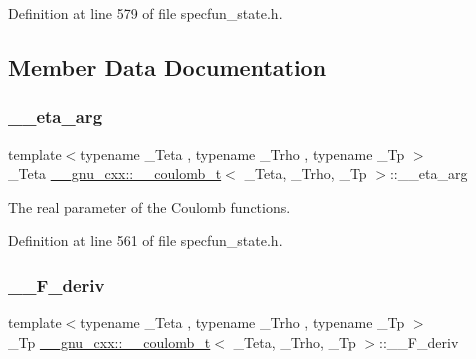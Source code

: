 Definition at line 579 of file specfun\+\_\+state.\+h.



\subsection{Member Data Documentation}
\mbox{\label{struct____gnu__cxx_1_1____coulomb__t_a174cc4a53442bfcd626bc07e1cba0162}} 
\subsubsection{\texorpdfstring{\+\_\+\+\_\+eta\+\_\+arg}{\_\_eta\_arg}}
{\footnotesize\ttfamily template$<$typename \+\_\+\+Teta , typename \+\_\+\+Trho , typename \+\_\+\+Tp $>$ \\
\+\_\+\+Teta \hyperlink{struct____gnu__cxx_1_1____coulomb__t}{\+\_\+\+\_\+gnu\+\_\+cxx\+::\+\_\+\+\_\+coulomb\+\_\+t}$<$ \+\_\+\+Teta, \+\_\+\+Trho, \+\_\+\+Tp $>$\+::\+\_\+\+\_\+eta\+\_\+arg}



The real parameter of the Coulomb functions. 



Definition at line 561 of file specfun\+\_\+state.\+h.

\mbox{\label{struct____gnu__cxx_1_1____coulomb__t_aab53d7d33fa9ba365222957dca6941ec}} 
\subsubsection{\texorpdfstring{\+\_\+\+\_\+\+F\+\_\+deriv}{\_\_F\_deriv}}
{\footnotesize\ttfamily template$<$typename \+\_\+\+Teta , typename \+\_\+\+Trho , typename \+\_\+\+Tp $>$ \\
\+\_\+\+Tp \hyperlink{struct____gnu__cxx_1_1____coulomb__t}{\+\_\+\+\_\+gnu\+\_\+cxx\+::\+\_\+\+\_\+coulomb\+\_\+t}$<$ \+\_\+\+Teta, \+\_\+\+Trho, \+\_\+\+Tp $>$\+::\+\_\+\+\_\+\+F\+\_\+deriv}



